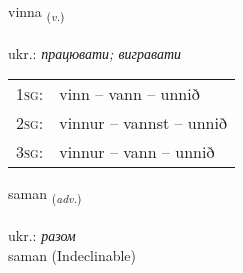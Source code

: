 \documentclass[frontgrid, backgrid]{flacards}\usepackage[]{graphicx}\usepackage[]{xcolor}
\begin{document}
\renewcommand{\flhead}{\vskip5pt \fboxsep=0pt {\small\bfseries\footnotesize Sagnorð | дієслово}}
\renewcommand{\fcfoot}{\vskip5pt \fboxsep=0pt \hspace{2pt}{\small\bfseries\footnotesize 1K}}

\renewcommand{\blhead}{\vskip5pt {\small\bfseries\footnotesize Sagnorð | дієслово }}
\renewcommand{\bcfoot}{\vskip5pt \hspace{2pt}{\small\bfseries\footnotesize 1K}}


{vinna \small{\textsubscript{(\textit{v.})}} \\[1ex] %
\textphonetic{[vɪna]} \\
ukr.: \emph{працювати; вигравати} \\  [2ex]
\renewcommand*{\arraystretch}{0.8}
\begin{tabular}{p{1cm}l}
\textsc{1sg}: & vinn -- vann -- unnið \\ 
\textsc{2sg}: & vinnur -- vannst -- unnið \\ 
\textsc{3sg}: & vinnur -- vann -- unnið \\ 
\end{tabular}
}


\renewcommand{\flhead}{\vskip5pt \fboxsep=0pt {\small\bfseries\footnotesize Atviksorð | прислівник}}
\renewcommand{\fcfoot}{\vskip5pt \fboxsep=0pt \hspace{2pt}{\small\bfseries\footnotesize 1K}}

\renewcommand{\blhead}{\vskip5pt {\small\bfseries\footnotesize Atviksorð | прислівник }}
\renewcommand{\bcfoot}{\vskip5pt \hspace{2pt}{\small\bfseries\footnotesize 1K}}


{saman \small{\textsubscript{(\textit{adv.})}} \\[1ex]
\textphonetic{[saːman]} \\
ukr.: \emph{разом} \\  [2ex]
saman (Indeclinable)}

\renewcommand{\flhead}{\vskip5pt \fboxsep=0pt {\small\bfseries\footnotesize Sagnorð | дієслово}}
\renewcommand{\fcfoot}{\vskip5pt \fboxsep=0pt \hspace{2pt}{\small\bfseries\footnotesize 1K}}
\end{document}
